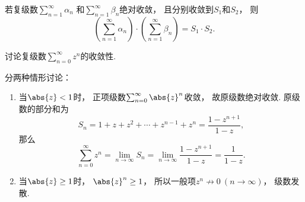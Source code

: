 \begin{theorem}
若复级数\(\sum_{n=1}^\infty \alpha_n\)
和\(\sum_{n=1}^\infty \beta_n\)绝对收敛，
且分别收敛到\(S_1\)和\(S_2\)，
则\[
	\left( \sum_{n=1}^\infty \alpha_n \right)
	\cdot \left( \sum_{n=1}^\infty \beta_n \right)
	= S_1 \cdot S_2.
\]
\end{theorem}

\begin{example}[复等比级数]\label{example:解析级数的级数表示.复等比级数}
讨论复级数\(\sum_{n=0}^\infty z^n\)的收敛性.
\begin{solution}
分两种情形讨论：\begin{enumerate}
	\item 当\(\abs{z} < 1\)时，
	正项级数\(\sum_{n=0}^\infty \abs{z}^n\)收敛，
	故原级数绝对收敛.
	原级数的部分和为\[
		S_n
		= 1 + z + z^2 + \dotsb + z^{n-1} + z^n
		= \frac{1-z^{n+1}}{1-z},
	\]
	那么\[
		\sum_{n=0}^\infty z^n
		= \lim_{n\to\infty} S_n
		= \lim_{n\to\infty} \frac{1-z^{n+1}}{1-z}
		= \frac{1}{1-z}.
	\]

	\item 当\(\abs{z} \geq 1\)时，
	\(\abs{z}^n \geq 1\)，
	所以一般项\(z^n \not\to 0\ (n\to\infty)\)，
	级数发散.
\end{enumerate}
\end{solution}
\end{example}
